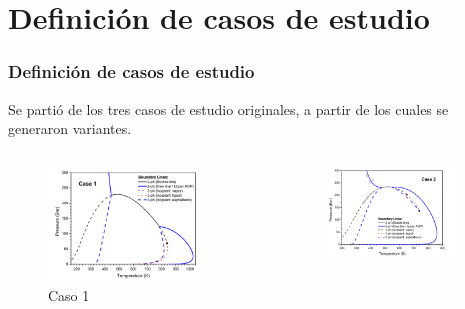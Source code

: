 \documentclass[aspectratio=1610,multi,rgb]{beamer}
\begin{document}
\section{Definición de casos de estudio}\label{casosestudios}
\begin{frame}[c]
    \frametitle{Definición de casos de estudio}

    Se partió de los tres casos de estudio originales, a partir de los cuales se
    generaron variantes.

    \begin{columns}
        \begin{figure}[htpb]
            \centering
            \includegraphics[width=0.9\textwidth]{figs/case1.png}
            \caption{Caso 1}
            \label{fig:case2}
        \end{figure}
        \begin{figure}[htpb]
            \centering
            \includegraphics[width=0.9\textwidth]{figs/case2.png}

\end{figure}
\end{columns}
\end{frame}
\end{document}
